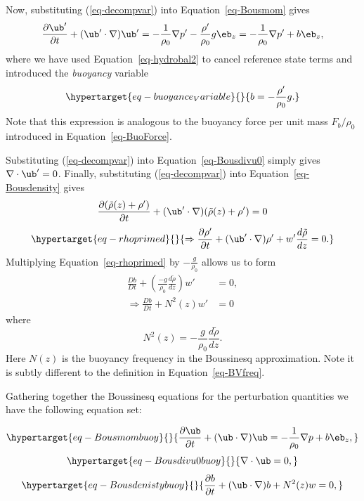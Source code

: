 \documentclass[
  letterpaper,
  twocolumn,
  landscape]{report}
\begin{document}
Now, substituting (\ref{eq-decompvar}) into Equation~\ref{eq-Bousmom}
gives \[
    \frac{\partial\ub'}{\partial t} + (\ub'\cdot\nabla)\ub' = -\frac{1}{\rho_0}\nabla p' -\frac{\rho'}{\rho_0}g\eb_z = -\frac{1}{\rho_0}\nabla p' +b\eb_z, 
\] where we have used Equation~\ref{eq-hydrobal2} to cancel reference
state terms and introduced the \emph{buoyancy} variable
\begin{equation}\protect\hypertarget{eq-buoyance_Variable}{}{ b = -\frac{\rho'}{\rho_0} g .
}\label{eq-buoyance_Variable}\end{equation} Note that this expression is
analogous to the buoyancy force per unit mass \(F_b/\rho_0\) introduced
in Equation~\ref{eq-BuoForce}.

Substituting (\ref{eq-decompvar}) into Equation~\ref{eq-Bousdivu0}
simply gives \(\nabla\cdot\ub'=0\). Finally, substituting
(\ref{eq-decompvar}) into Equation~\ref{eq-Bousdensity} gives \[
\frac{\partial(\tilde \rho(z)+\rho')}{\partial t} + (\ub'\cdot\nabla)(\tilde\rho(z)+\rho')=0\]
\begin{equation}\protect\hypertarget{eq-rhoprimed}{}{\Rightarrow \frac{\partial\rho'}{\partial t} + (\ub'\cdot\nabla)\rho' + w'\frac{d\tilde\rho}{dz}=0.}\label{eq-rhoprimed}\end{equation}
Multiplying Equation~\ref{eq-rhoprimed} by \(-\frac{g}{\rho_0}\) allows
us to form \begin{align*}
 \frac{Db}{Dt}+\left(\frac{-g}{\rho_0}\frac{d\tilde\rho}{dz}\right)w'&=0,\\
 \Rightarrow\frac{Db}{Dt}+N^2(z)w'&=0
\end{align*} where \[
N^2(z) = -\frac{g}{\rho_0}\frac{d\tilde\rho}{dz}.
\] Here \(N(z)\) is the buoyancy frequency in the Boussinesq
approximation. Note it is subtly different to the definition in
Equation~\ref{eq-BVfreq}.

Gathering together the Boussinesq equations for the perturbation
quantities we have the following equation set:

\begin{tcolorbox}[enhanced jigsaw, left=2mm, opacityback=0, coltitle=black, bottomtitle=1mm, title={\textbf{(Non-hydrostatic) Boussinesq Equations}}, toprule=.15mm, colbacktitle=quarto-callout-important-color!10!white, breakable, arc=.35mm, titlerule=0mm, colback=white, toptitle=1mm, opacitybacktitle=0.6, rightrule=.15mm, bottomrule=.15mm, colframe=quarto-callout-important-color-frame, leftrule=.75mm]

\begin{equation}\protect\hypertarget{eq-Bousmombuoy}{}{ \frac{\partial\ub}{\partial t} + (\ub\cdot\nabla)\ub = -\frac{1}{\rho_0}\nabla p +b\eb_z, }\label{eq-Bousmombuoy}\end{equation}
\begin{equation}\protect\hypertarget{eq-Bousdivu0buoy}{}{\nabla\cdot\ub=0,  }\label{eq-Bousdivu0buoy}\end{equation}
\begin{equation}\protect\hypertarget{eq-Bousdenistybuoy}{}{\frac{\partial b}{\partial t}+(\ub\cdot\nabla)b+N^2(z)w=0,}\label{eq-Bousdenistybuoy}\end{equation}

\end{tcolorbox}
\end{document}
